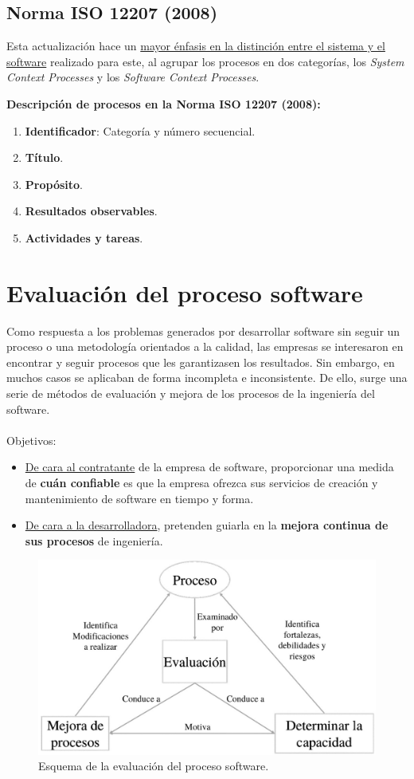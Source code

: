 \subsection{Norma ISO 12207 (2008)}

Esta actualización hace un \uline{mayor énfasis en la distinción entre el sistema y el software} realizado para este, al agrupar los procesos en dos categorías, los \textit{System Context Processes} y los \textit{Software Context Processes}.

\textbf{Descripción de procesos en la Norma ISO 12207 (2008):}

\begin{enumerate}
    \item \textbf{Identificador}: Categoría y número secuencial.
    \item \textbf{Título}.
    \item \textbf{Propósito}.
    \item \textbf{Resultados observables}.
    \item \textbf{Actividades y tareas}.
\end{enumerate}


\section{Evaluación del proceso software}
Como respuesta a los problemas generados por desarrollar software sin seguir un proceso o una metodología orientados a la calidad, las empresas se interesaron en encontrar y seguir procesos que les garantizasen los resultados. Sin embargo, en muchos casos se aplicaban de forma incompleta e inconsistente. De ello, surge una serie de métodos de evaluación y mejora de los procesos de la ingeniería del software.
\\\\
Objetivos:
\begin{itemize}
    \item \uline{De cara al contratante} de la empresa de software, proporcionar una medida de \textbf{cuán confiable} es que la empresa ofrezca sus servicios de creación y mantenimiento de software en tiempo y forma.
    \item \uline{De cara a la desarrolladora}, pretenden guiarla en la \textbf{mejora continua de sus procesos} de ingeniería.
\end{itemize}

\begin{figure}[H]
    \centering
    \includegraphics[width=0.6\linewidth]{Resources/evaluacionSoftware}
    \caption{Esquema de la evaluación del proceso software.}
    \label{fig:evaluacionSoftware}
\end{figure}

